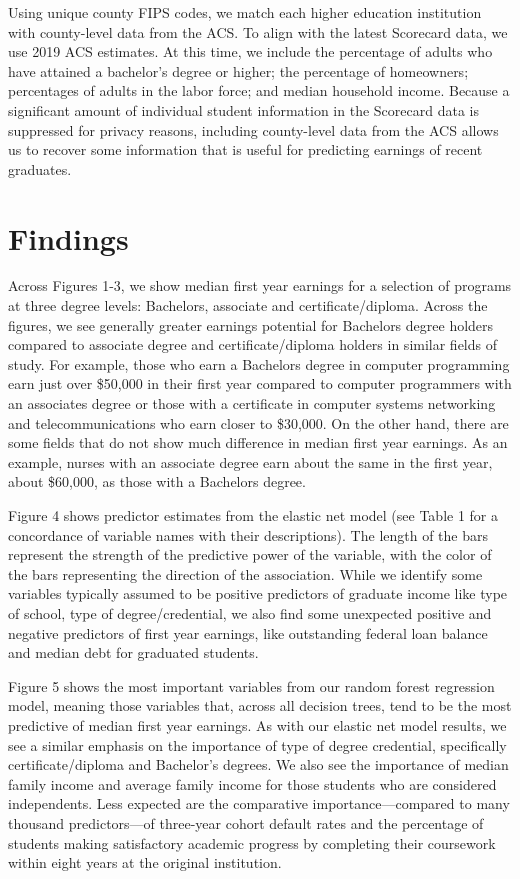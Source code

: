 \documentclass[a4paper, 12pt]{article}
\begin{document}
Using unique county FIPS codes, we match each higher education
institution with county-level data from the ACS. To align with the
latest Scorecard data, we use 2019 ACS estimates. At this time, we
include the percentage of adults who have attained a bachelor's degree
or higher; the percentage of homeowners; percentages of adults in the
labor force; and median household income. Because a significant amount
of individual student information in the Scorecard data is suppressed
for privacy reasons, including county-level data from the ACS allows
us to recover some information that is useful for predicting earnings
of recent graduates.

\section*{Findings}

Across Figures 1-3, we show median first year earnings for a selection
of programs at three degree levels: Bachelors, associate and
certificate/diploma. Across the figures, we see generally greater
earnings potential for Bachelors degree holders compared to associate
degree and certificate/diploma holders in similar fields of study. For
example, those who earn a Bachelors degree in computer programming
earn just over \$50,000 in their first year compared to computer
programmers with an associates degree or those with a certificate in
computer systems networking and telecommunications who earn closer to
\$30,000. On the other hand, there are some fields that do not show
much difference in median first year earnings. As an example, nurses
with an associate degree earn about the same in the first year, about
\$60,000, as those with a Bachelors degree.

Figure 4 shows predictor estimates from the elastic net model (see
Table 1 for a concordance of variable names with their
descriptions). The length of the bars represent the strength of the
predictive power of the variable, with the color of the bars
representing the direction of the association. While we identify some
variables typically assumed to be positive predictors of graduate
income like type of school, type of degree/credential, we also find
some unexpected positive and negative predictors of first year
earnings, like outstanding federal loan balance and median debt for
graduated students.

Figure 5 shows the most important variables from our random forest
regression model, meaning those variables that, across all decision
trees, tend to be the most predictive of median first year
earnings. As with our elastic net model results, we see a similar
emphasis on the importance of type of degree credential, specifically
certificate/diploma and Bachelor's degrees. We also see the importance
of median family income and average family income for those students
who are considered independents. Less expected are the comparative
importance---compared to many thousand predictors---of three-year
cohort default rates and the percentage of students making
satisfactory academic progress by completing their coursework within
eight years at the original institution.
\end{document}
